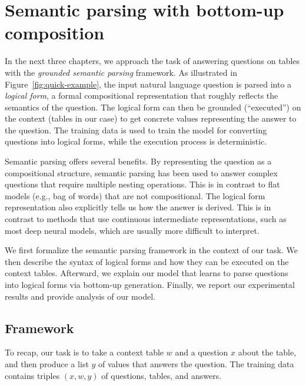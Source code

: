 \chapter{Semantic parsing with bottom-up composition}\label{chp:parsing}

In the next three chapters,
we approach the task of answering questions on tables
with the \emph{grounded semantic parsing} framework.
As illustrated in Figure~\ref{fig:quick-example},
the input natural language question is parsed
into a \emph{logical form},
a formal compositional representation that roughly reflects
the semantics of the question.
The logical form can then be grounded (``executed'')
on the context (tables in our case)
to get concrete values representing the answer to the question.
The training data is used to train the model
for converting questions into logical forms,
while the execution process is deterministic.

Semantic parsing offers several benefits.
By representing the question as a compositional structure,
semantic parsing has been used to answer complex questions
that require multiple nesting operations.
This is in contrast to flat models (e.g., bag of words)
that are not compositional.
The logical form representation
also explicitly tells us how the answer is derived.
This is in contrast to methods that use 
continuous intermediate representations,
such as most deep neural models,
which are usually more difficult to interpret.

We first formalize the semantic parsing framework
in the context of our task.
We then describe the syntax of logical forms
and how they can be executed on the context tables.
Afterward, we explain our model that learns to parse
questions into logical forms via bottom-up generation.
Finally, we report our experimental results
and provide analysis of our model.

\section{Framework}

To recap, our task is to take a context table $w$
and a question $x$ about the table,
and then produce a list $y$ of values that answers the question.
The training data contains triples $(x,w,y)$
of questions, tables, and answers.


